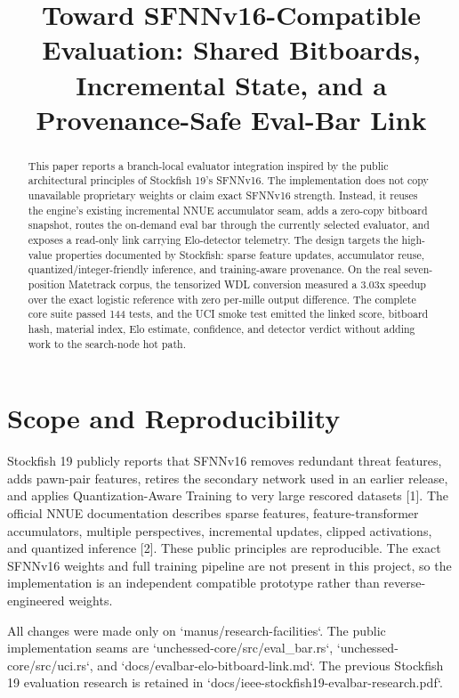 \documentclass[10pt,conference]{IEEEtran}
\title{Toward SFNNv16-Compatible Evaluation: Shared Bitboards, Incremental State, and a Provenance-Safe Eval-Bar Link}
\author{\IEEEauthorblockN{Manus AI}\IEEEauthorblockA{Unchessed UCI Engine Research\\September 2026}}
\begin{document}
\maketitle
\begin{abstract}
This paper reports a branch-local evaluator integration inspired by the public architectural principles of Stockfish 19's SFNNv16. The implementation does not copy unavailable proprietary weights or claim exact SFNNv16 strength. Instead, it reuses the engine's existing incremental NNUE accumulator seam, adds a zero-copy bitboard snapshot, routes the on-demand eval bar through the currently selected evaluator, and exposes a read-only link carrying Elo-detector telemetry. The design targets the high-value properties documented by Stockfish: sparse feature updates, accumulator reuse, quantized/integer-friendly inference, and training-aware provenance. On the real seven-position Matetrack corpus, the tensorized WDL conversion measured a 3.03x speedup over the exact logistic reference with zero per-mille output difference. The complete core suite passed 144 tests, and the UCI smoke test emitted the linked score, bitboard hash, material index, Elo estimate, confidence, and detector verdict without adding work to the search-node hot path.
\end{abstract}

\section{Scope and Reproducibility}
Stockfish 19 publicly reports that SFNNv16 removes redundant threat features, adds pawn-pair features, retires the secondary network used in an earlier release, and applies Quantization-Aware Training to very large rescored datasets [1]. The official NNUE documentation describes sparse features, feature-transformer accumulators, multiple perspectives, incremental updates, clipped activations, and quantized inference [2]. These public principles are reproducible. The exact SFNNv16 weights and full training pipeline are not present in this project, so the implementation is an independent compatible prototype rather than reverse-engineered weights.

All changes were made only on `manus/research-facilities`. The public implementation seams are `unchessed-core/src/eval\_bar.rs`, `unchessed-core/src/uci.rs`, and `docs/evalbar-elo-bitboard-link.md`. The previous Stockfish 19 evaluation research is retained in `docs/ieee-stockfish19-evalbar-research.pdf`.
\end{document}
